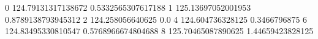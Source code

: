 0 124.79131317138672 0.5332565307617188
1 125.13697052001953 0.8789138793945312
2 124.258056640625 0.0
4 124.604736328125 0.3466796875
6 124.83495330810547 0.5768966674804688
8 125.70465087890625 1.44659423828125
